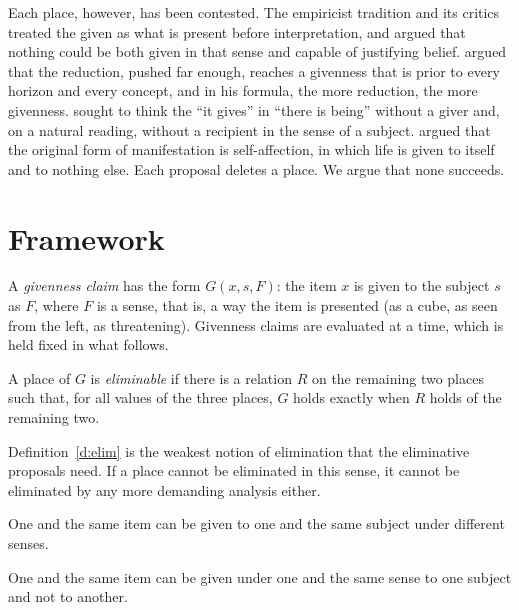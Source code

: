 \documentclass{situationist-preprint}
\begin{document}
Each place, however, has been contested. The empiricist tradition and its critics treated the given as what is present before interpretation, and \citet{Sellars1956} argued that nothing could be both given in that sense and capable of justifying belief. \citet{Marion1989,Marion1997} argued that the reduction, pushed far enough, reaches a givenness that is prior to every horizon and every concept, and in his formula, the more reduction, the more givenness. \citet{Heidegger1969} sought to think the \enquote{it gives} in \enquote{there is being} without a giver and, on a natural reading, without a recipient in the sense of a subject. \citet{Henry1963} argued that the original form of manifestation is self-affection, in which life is given to itself and to nothing else. Each proposal deletes a place. We argue that none succeeds.

\section{Framework}

\begin{definition}\label{d:giv}
A \emph{givenness claim} has the form $G(x, s, F)$: the item $x$ is given to the subject $s$ as $F$, where $F$ is a sense, that is, a way the item is presented (as a cube, as seen from the left, as threatening). Givenness claims are evaluated at a time, which is held fixed in what follows.
\end{definition}

\begin{definition}\label{d:elim}
A place of $G$ is \emph{eliminable} if there is a relation $R$ on the remaining two places such that, for all values of the three places, $G$ holds exactly when $R$ holds of the remaining two.
\end{definition}

Definition~\ref{d:elim} is the weakest notion of elimination that the eliminative proposals need. If a place cannot be eliminated in this sense, it cannot be eliminated by any more demanding analysis either.

\begin{principle}\label{p:aspect}
One and the same item can be given to one and the same subject under different senses.
\end{principle}

\begin{principle}\label{p:subject}
One and the same item can be given under one and the same sense to one subject and not to another.
\end{principle}
\end{document}
